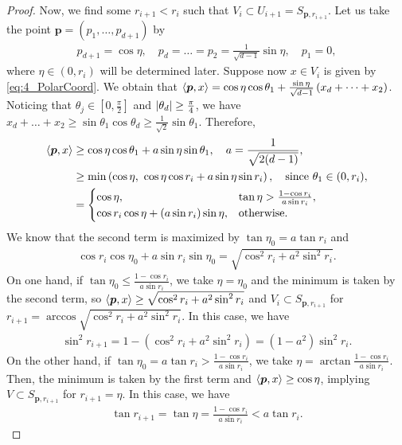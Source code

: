 \begin{proof}
  Now, we find some $r_{i+1} < r_i$ such that
  $V_i \subset U_{i+1} = S_{\bm{p},r_{i+1}}$.
  Let us take the point $\bm{p} = (p_1,\dots,p_{d+1})$ by
  \begin{align*}
    p_{d+1} = \cos \eta, \quad p_d = \dots = p_2 = \frac{1}{\sqrt {d-1}} \sin \eta, \quad p_1 = 0,
  \end{align*}
  where $\eta \in (0,r_i)$ will be determined later.
  Suppose now $x \in V_i$ is given by \cref{eq:4_PolarCoord}.
  We obtain that
  $\left\langle{\bm{p},x}\right\rangle = \cos \eta \cos \theta_1 + \frac{\sin \eta}{\sqrt {d-1}} \left( x_{d} + \dots + x_2 \right)$.
  Noticing that $\theta_j \in [0,\frac{\pi}{2}]$ and $\abs{\theta_d} \geq \frac{\pi}{4}$, we have
  $x_{d} + \dots + x_2 \geq \sin \theta_1 \cos \theta_d \geq \frac{1}{\sqrt {2}} \sin \theta_1$.
  Therefore,
  \begin{align*}
    \left\langle{\bm{p},x}\right\rangle &\geq \cos \eta \cos \theta_1 + a \sin \eta \sin \theta_1, \quad a = \frac{1}{\sqrt {2(d-1)}}, \\
    & \geq \min\left( \cos\eta,\  \cos \eta \cos r_i + a \sin \eta \sin r_i \right), \quad \text{since } \theta_1 \in (0,r_i), \\
    &=
    \begin{cases}
      \cos\eta, & \tan \eta > \frac{1 - \cos r_i}{a \sin r_i}, \\
      \cos r_i \cos \eta  + (a \sin r_i) \sin \eta, & \text{otherwise}.
    \end{cases}
  \end{align*}
  We know that the second term is maximized by $\tan \eta_0 = a \tan r_i$ and
  \begin{align*}
    \cos r_i \cos \eta_0 + a \sin r_i \sin \eta_0  = \sqrt {\cos^2 r_i + a^2 \sin^2 r_i}.
  \end{align*}
  On one hand, if $\tan \eta_0 \leq \frac{1 - \cos r_i}{a \sin r_i}$,
  we take $\eta = \eta_0$ and the minimum is taken by the second term, so
  $\left\langle{\bm{p},x}\right\rangle  \geq \sqrt {\cos^2 r_i + a^2 \sin^2 r_i}$
  and $V_i \subset S_{\bm{p},r_{i+1}}$ for $r_{i+1} = \arccos \sqrt {\cos^2 r_i + a^2 \sin^2 r_i}$.
  In this case, we have
  \begin{align}
    \label{eq:4_ProofRRelation1}
    \sin^2 r_{i+1} = 1 - (\cos^2 r_i + a^2 \sin^2 r_i) = (1-a^2) \sin^2 r_i.
  \end{align}
  On the other hand, if $\tan \eta_0 = a \tan r_i > \frac{1 - \cos r_i}{a \sin r_i}$,
  we take $\eta = \arctan \frac{1 - \cos r_i}{a \sin r_i}$.
  Then, the minimum is taken by the first term and $\left\langle{\bm{p},x}\right\rangle \geq \cos \eta$, implying
  $V \subset S_{\bm{p},r_{i+1}}$ for $r_{i+1} = \eta$.
  In this case, we have
  \begin{align}
    \label{eq:4_ProofRRelation2}
    \tan r_{i+1} = \tan \eta = \frac{1 - \cos r_i}{a \sin r_i} < a \tan r_i.
  \end{align}


\end{proof}
